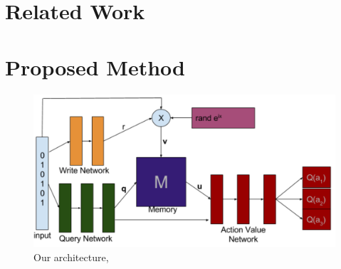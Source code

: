 \documentclass{article}
\begin{document}
\section*{Related Work}

\section*{Proposed Method}
\begin{figure}[!ht]
\includegraphics[width=1\textwidth]{images/architecture.png}
\caption{Our architecture, }
\label{fig:arch}
\end{figure}
\end{document}
